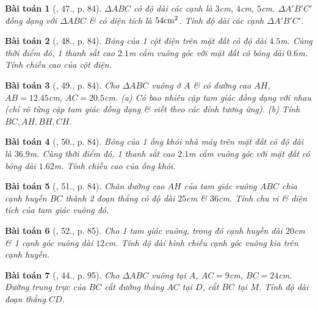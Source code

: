 \documentclass{article}
\newtheorem{baitoan}{Bài toán}
\begin{document}
\begin{baitoan}[\cite{SGK_Toan_8_tap_2}, 47., p. 84]
	$\Delta ABC$ có độ dài các cạnh là $3$\emph{cm}, $4$\emph{cm}, $5$\emph{cm}. $\Delta A'B'C'$ đồng dạng với $\Delta ABC$ \& có diện tích là $54{\rm cm}^2$. Tính độ dài các cạnh $\Delta A'B'C'$.
\end{baitoan}

\begin{baitoan}[\cite{SGK_Toan_8_tap_2}, 48., p. 84]
	Bóng của 1 cột điện trên mặt đất có độ dài $4.5$\emph{m}. Cùng thời điểm đó, 1 thanh sắt cao $2.1$\emph{m} cắm vuông góc với mặt đất có bóng dài $0.6$\emph{m}. Tính chiều cao của cột điện.
\end{baitoan}

\begin{baitoan}[\cite{SGK_Toan_8_tap_2}, 49., p. 84]
	Cho $\Delta ABC$ vuông ở $A$ \& có đường cao $AH$, $AB = 12.45$\emph{cm}, $AC = 20.5$\emph{cm}. (a) Có bao nhiêu cặp tam giác đồng dạng với nhau (chỉ rõ từng cặp tam giác đồng dạng \& viết theo các đỉnh tương ứng). (b) Tính $BC,AH,BH,CH$.
\end{baitoan}

\begin{baitoan}[\cite{SGK_Toan_8_tap_2}, 50., p. 84]
	Bóng của 1 ống khói nhà máy trên mặt đất có độ dài là $36.9$\emph{m}. Cùng thời điểm đó, 1 thanh sắt cao $2.1$\emph{m} cắm vuông góc với mặt đất có bóng dài $1.62$\emph{m}. Tính chiều cao của ống khói.
\end{baitoan}

\begin{baitoan}[\cite{SGK_Toan_8_tap_2}, 51., p. 84]
	Chân đường cao $AH$ của tam giác vuông $ABC$ chia cạnh huyền $BC$ thành 2 đoạn thẳng có độ dài $25$\emph{cm} \& $36$\emph{cm}. Tính chu vi \& diện tích của tam giác vuông đó.
\end{baitoan}

\begin{baitoan}[\cite{SGK_Toan_8_tap_2}, 52., p. 85]
	Cho 1 tam giác vuông, trong đó cạnh huyền dài $20$\emph{cm} \& 1 cạnh góc vuông dài $12$\emph{cm}. Tính độ dài hình chiếu cạnh góc vuông kia trên cạnh huyền.
\end{baitoan}

\begin{baitoan}[\cite{SBT_Toan_8_tap_2}, 44., p. 95]
	Cho $\Delta ABC$ vuông tại $A$, $AC = 9$\emph{cm}, $BC = 24$\emph{cm}. Đường trung trực của $BC$ cắt đường thẳng $AC$ tại $D$, cắt $BC$ tại $M$. Tính độ dài đoạn thẳng $CD$.
\end{baitoan}
\end{document}
